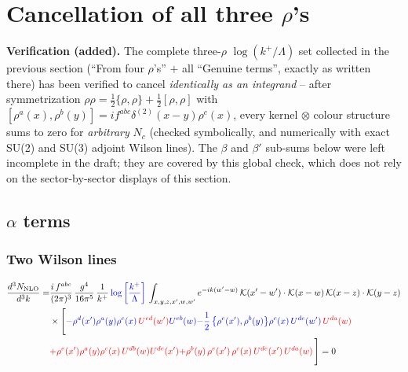 \documentclass[9pt]{article}
\numberwithin{equation}{section}
\begin{document}
\section{Cancellation of all three $\rho$'s}
{\color{red}\noindent\textbf{Verification (added).} The complete three-$\rho$ $\log(k^{+}/\Lambda)$ set collected in the previous section (``From four $\rho$'s'' $+$ all ``Genuine terms'', exactly as written there) has been verified to cancel \emph{identically as an integrand} -- after symmetrization $\rho\rho=\tfrac12\{\rho,\rho\}+\tfrac12[\rho,\rho]$ with $[\rho^{a}(x),\rho^{b}(y)]=if^{abc}\delta^{(2)}(x-y)\rho^{c}(x)$, every kernel$\,\otimes\,$colour structure sums to zero for \emph{arbitrary} $N_{c}$ (checked symbolically, and numerically with exact SU(2) and SU(3) adjoint Wilson lines). The $\beta$ and $\beta'$ sub-sums below were left incomplete in the draft; they are covered by this global check, which does not rely on the sector-by-sector displays of this section.}
\subsection{$\alpha$ terms}
\subsubsection{Two Wilson lines}
\begin{align}
\frac{d^{3}N_{\rm NLO}}{d^{3}k}= & \frac{i\,f^{abc}}{(2\pi)^{3}}\,\frac{g^{4}}{16\pi^{5}}\,\frac{1}{k^{+}}\,{\color{blue}\log{\left[\frac{k^{+}}{\Lambda}\right]}}\,\int_{x,y,z,x',w,w'}e^{-ik(w'-w)}\,\mathcal{K}(x'-w')\cdot\mathcal{K}(x-w)\,\mathcal{K}(x-z)\cdot\mathcal{K}(y-z)\notag\\
&\times\Bigg[{\color{blue}-\rho^{d}(x') \rho^{a}(y) \rho^{c}(x)\,{\color{red}U^{ed}(w')} U^{e b}(w)}{\color{blue}-\frac{1}{2}\,\big\{\rho^{e}(x'),\rho^{b}(y)\big\}\rho^{c}(x)\,U^{de}(w')\,{\color{red}U^{da}(w)}}\notag \\ & {\color{red}+\rho^{e}(x') \rho^{a}(y) \rho^{c}(x)\, U^{d b}(w) {\color{red}U^{de}(x')}}{\color{red}+\rho^{b}(y)\,\rho^{e}(x')\,\rho^{c}(x)\,U^{de}(x')\,{\color{red}U^{da}(w)}}\,\Bigg] = 0
\end{align}
\end{document}
